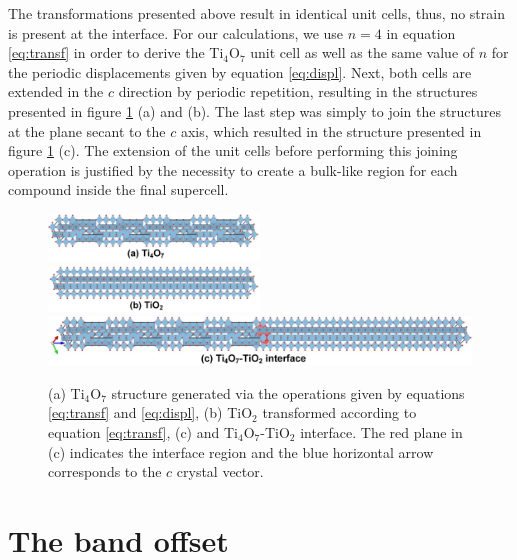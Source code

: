 The transformations presented above result in identical unit cells, thus, no strain is present at the interface. For our calculations, we use $n = 4$ in equation \ref{eq:transf} in order to derive the Ti$_4$O$_7$ unit cell as well as the same value of $n$ for the periodic displacements given by equation \ref{eq:displ}. Next, both cells are extended in the $c$ direction by periodic repetition, resulting in the structures presented in figure \ref{fig:struct-interface} (a) and (b). The last step was simply to join the structures at the plane secant to the $c$ axis, which resulted in the structure presented in figure \ref{fig:struct-interface} (c). The extension of the unit cells before performing this joining operation is justified by the necessity to create a bulk-like region for each compound inside the final supercell.
\begin{center}
 \begin{figure}[ht!]
   \includegraphics[width=0.5\textwidth]{img/ti4o7-big.jpg}
   \includegraphics[width=0.5\textwidth]{img/tio2-big.jpg}
   \includegraphics[width=1.0\textwidth]{img/interface-big.jpg}
  \caption{(a) Ti${}_4$O${}_7$ structure generated via the operations given by equations \ref{eq:transf} and \ref{eq:displ}, (b) TiO${}_2$ transformed according to equation \ref{eq:transf}, (c) and Ti${}_4$O${}_7$-TiO${}_2$ interface. The red plane in (c) indicates the interface region and the blue horizontal arrow corresponds to the $c$ crystal vector.}
  \label{fig:struct-interface}
 \end{figure}
\end{center}

\section{The band offset}
\label{sec:band-offset}

